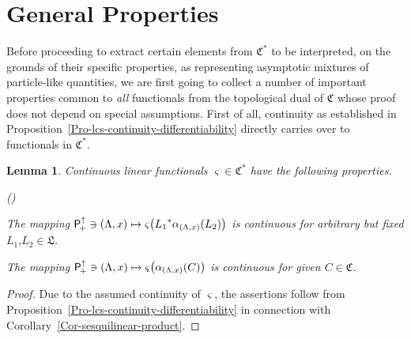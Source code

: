 \documentclass[11pt,twoside,openright]{report}
\theoremstyle{definition}
\theoremstyle{plain}
\newtheorem{Lem}[Def]{Lemma}
\theoremstyle{remark}
\theoremstyle{assumption}
\newcommand{\Cfrak}{\mathfrak{C}}
\newcommand{\Lfrak}{\mathfrak{L}}
\newcommand{\Poin}{\mathsf{P}_{\negthinspace +}^\uparrow}
\newcommand{\Cstar}{\mathfrak{C}^*}
\newcommand{\aLax}{\alpha_{( \Lambda , x )}}
\newcounter{propitem}
\newenvironment{proplist}{\begin{list}{(\roman{propitem})}%
  {\usecounter{propitem} \setlength{\topsep}{0ex}%
   \setlength{\parsep}{0.2ex} \setlength{\itemsep}{0.4ex}%
   \setlength{\leftmargin}{0em} \setlength{\itemindent}{0.5em}%
   }}{\end{list}}
\begin{document}
\section{General Properties}
  \label{sec-gen-prop}

Before proceeding to extract certain elements from $\Cstar$ to be
interpreted, on the grounds of their specific properties, as
representing asymptotic mixtures of particle-like quantities, we are
first going to collect a number of important properties common to
\emph{all} functionals from the topological dual of $\Cfrak$ whose
proof does not depend on special assumptions. First of all, continuity
as established in
Proposition~\ref{Pro-lcs-continuity-differentiability} directly
carries over to functionals in $\Cstar$.
\begin{Lem}
  \label{Lem-varsigma-continuity}
  Continuous linear functionals $\varsigma \in \Cstar$ have the
  following properties.
  \begin{proplist}
  \item The mapping $\Poin \ni ( \Lambda , x ) \mapsto \varsigma
    \bigl( {L_1}^* \aLax ( L_2 ) \bigr)$ is continuous for arbitrary
    but fixed $L_1 \text{,} L_2 \in \Lfrak$.
  \item The mapping $\Poin \ni ( \Lambda , x ) \mapsto \varsigma
    \bigl( \aLax ( C ) \bigr)$ is continuous for given $C \in \Cfrak$.
  \end{proplist}
\end{Lem}
\begin{proof}
  Due to the assumed continuity of $\varsigma$, the assertions follow
  from Proposition~\ref{Pro-lcs-continuity-differentiability} in
  connection with Corollary~\ref{Cor-sesquilinear-product}.
\end{proof}
\end{document}

